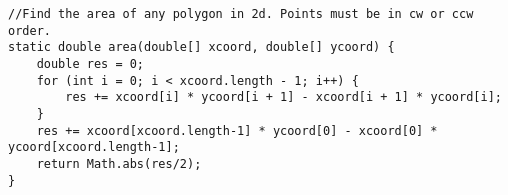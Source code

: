 \begin{verbatim}
//Find the area of any polygon in 2d. Points must be in cw or ccw order.
static double area(double[] xcoord, double[] ycoord) {
	double res = 0;
	for (int i = 0; i < xcoord.length - 1; i++) {
		res += xcoord[i] * ycoord[i + 1] - xcoord[i + 1] * ycoord[i];
	}
	res += xcoord[xcoord.length-1] * ycoord[0] - xcoord[0] * ycoord[xcoord.length-1];
	return Math.abs(res/2);
}
\end{verbatim}